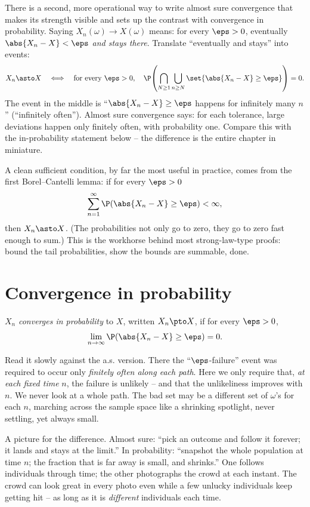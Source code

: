 There is a second, more operational way to write almost sure convergence that makes
its strength visible and sets up the contrast with convergence in probability. Saying
$X_n(\omega) \to X(\omega)$ means: for every $\eps>0$, eventually $\abs{X_n - X} <
\eps$ \emph{and stays there}. Translate ``eventually and stays'' into events:
\[
  X_n \asto X
  \quad\Longleftrightarrow\quad
  \text{for every } \eps>0,\quad
  \P\!\left(\bigcap_{N\ge1}\bigcup_{n\ge N} \set{\abs{X_n - X} \ge \eps}\right) = 0.
\]
The event in the middle is ``$\abs{X_n - X}\ge\eps$ happens for infinitely many $n$''
(``infinitely often''). Almost sure convergence says: for each tolerance, large
deviations happen only finitely often, with probability one. Compare this with the
in-probability statement below -- the difference is the entire chapter in miniature.

\begin{formalbox}
A clean sufficient condition, by far the most useful in practice, comes from the
first Borel--Cantelli lemma: if for every $\eps>0$
\[
  \sum_{n=1}^{\infty} \P\!\left(\abs{X_n - X} \ge \eps\right) < \infty,
\]
then $X_n \asto X$. (The probabilities not only go to zero, they go to zero fast
enough to sum.) This is the workhorse behind most strong-law-type proofs: bound the
tail probabilities, show the bounds are summable, done.
\end{formalbox}

\section{Convergence in probability}
\label{ch22:prob}

\begin{definition}
\label{ch22:def-prob}
$X_n$ \emph{converges in probability} to $X$, written $X_n \pto X$, if for every
$\eps > 0$,
\[
  \lim_{n\to\infty} \P\!\left(\abs{X_n - X} \ge \eps\right) = 0.
\]
\end{definition}

Read it slowly against the a.s. version. There the ``$\eps$-failure'' event was
required to occur only \emph{finitely often along each path}. Here we only require
that, \emph{at each fixed time} $n$, the failure is unlikely -- and that the
unlikeliness improves with $n$. We never look at a whole path. The bad set may be a
different set of $\omega$'s for each $n$, marching across the sample space like a
shrinking spotlight, never settling, yet always small.

\begin{intuitionbox}
A picture for the difference. Almost sure: ``pick an outcome and follow it forever;
it lands and stays at the limit.'' In probability: ``snapshot the whole population at
time $n$; the fraction that is far away is small, and shrinks.'' One follows
individuals through time; the other photographs the crowd at each instant. The crowd
can look great in every photo even while a few unlucky individuals keep getting hit --
as long as it is \emph{different} individuals each time.
\end{intuitionbox}

